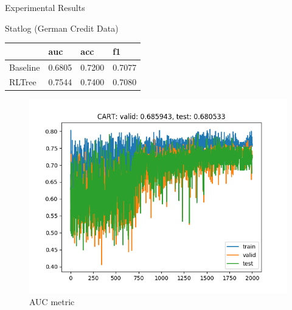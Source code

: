 \documentclass{beamer}
\begin{document}
\begin{frame}{Experimental Results}
	\begin{block}{Statlog (German Credit Data)}
		\begin{table}[]
			\begin{tabular}{llll}
				\hline
				& auc    & acc    & f1     \\ \hline
				Baseline & 0.6805 & 0.7200 & 0.7077 \\
				RLTree   & 0.7544 & 0.7400 & 0.7080 \\ \hline
			\end{tabular}
		\end{table}
	\end{block}
	\begin{figure}{}
		\includegraphics[scale=0.4]{german_auc_sample_curve}
		\caption{AUC metric}
	\end{figure}
\end{frame}
\end{document}
